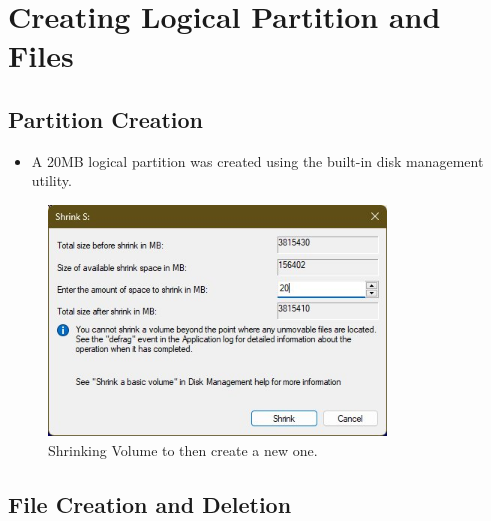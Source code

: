\documentclass[11pt]{article}
\begin{document}
\section{Creating Logical Partition and Files}

\subsection{Partition Creation}
\begin{itemize}
    \item A 20MB logical partition was created using the built-in disk management utility.
\end{itemize}
\begin{figure}[H]
    \centering
    \includegraphics[width=0.8\textwidth]{shrink.jpg}
    \caption{Shrinking Volume to then create a new one. }
    \label{fig:1}
\end{figure}

\subsection{File Creation and Deletion}
\end{document}
